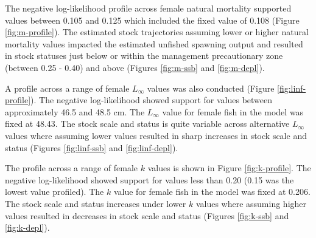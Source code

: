 \documentclass[11pt,
  english,
  a4paper,
]{article}
\begin{document}
\leavevmode\tagmcend\tagstructend\par


The negative log-likelihood profile across female natural mortality supported values between 0.105 and 0.125 which included the fixed value of 0.108 (Figure \ref{fig:m-profile}). The estimated stock trajectories assuming lower or higher natural mortality values impacted the estimated unfished spawning output and resulted in stock statuses just below or within the management precautionary zone (between 0.25 - 0.40) and above (Figures \ref{fig:m-ssb} and \ref{fig:m-depl}).

\leavevmode\tagmcend\tagstructend\par


A profile across a range of female {\(L_{\infty}\)\leavevmode\tagmcend\tagstructend} values was also conducted (Figure \ref{fig:linf-profile}). The negative log-likelihood showed support for values between approximately 46.5 and 48.5 cm. The {\(L_{\infty}\)\leavevmode\tagmcend\tagstructend} value for female fish in the model was fixed at 48.43. The stock scale and status is quite variable across alternative {\(L_{\infty}\)\leavevmode\tagmcend\tagstructend} values where assuming lower values resulted in sharp increases in stock scale and status (Figures \ref{fig:linf-ssb} and \ref{fig:linf-depl}).

\leavevmode\tagmcend\tagstructend\par


The profile across a range of female {\(k\)\leavevmode\tagmcend\tagstructend} values is shown in Figure \ref{fig:k-profile}. The negative log-likelihood showed support for values less than 0.20 (0.15 was the lowest value profiled). The {\(k\)\leavevmode\tagmcend\tagstructend} value for female fish in the model was fixed at 0.206. The stock scale and status increases under lower {\(k\)\leavevmode\tagmcend\tagstructend} values where assuming higher values resulted in decreases in stock scale and status (Figures \ref{fig:k-ssb} and \ref{fig:k-depl}).
\end{document}
